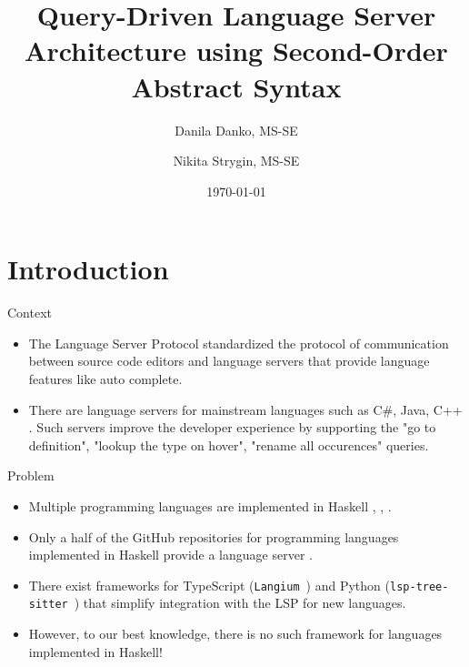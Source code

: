 \documentclass[serif, aspectratio=169]{beamer}
\author[Danko, Strygin]{Danila Danko, MS-SE \inst{1} \and Nikita Strygin, MS-SE \inst{1} \and \newline \newline {Supervisor: Nikolai Kudasov \inst{1}}}
\title{Query-Driven Language Server Architecture using Second-Order Abstract Syntax}
\institute{
    \inst{1}Innopolis University
}
\date{\small \today}
\begin{document}
\begin{frame}
	\titlepage
\end{frame}

\begin{frame}
	\tableofcontents[sectionstyle=show,
		subsectionstyle=show/shaded/hide,
		subsubsectionstyle=show/shaded/hide]
\end{frame}

\section{Introduction}

\begin{frame}{Context}
	\begin{itemize}
		[<+-| alert+>] %
		\item The Language Server Protocol \cite{noauthor_language_server_protocol_2024} standardized the protocol of communication between source code editors and language servers that provide language features like auto complete.
		\item There are language servers for mainstream languages such as C\#, Java, C++ \cite{lsp_implementations}. Such servers improve the developer experience by supporting the "go to definition", "lookup the type on hover", "rename all occurences" queries.
	\end{itemize}
\end{frame}

\begin{frame}{Problem}
	\begin{itemize}
		[<+-| alert+>] %
		\item Multiple programming languages are implemented in Haskell \cite{github_haskell_programming_language}, \cite{hackage_formal_languages}, \cite{hackage_language}.
		\item Only a half of the GitHub repositories for programming languages implemented in Haskell provide a language server \cite{github_lsp_module}.
		\item There exist frameworks for TypeScript (\texttt{Langium}~\cite{noauthor_langium_nodate}) and Python (\texttt{lsp-tree-sitter}~\cite{noauthor_neomuttlsp-tree-sitter_2024}) that simplify integration with the LSP for new languages.
		\item However, to our best knowledge, there is no such framework for languages implemented in Haskell!
	\end{itemize}
\end{frame}
\end{document}
